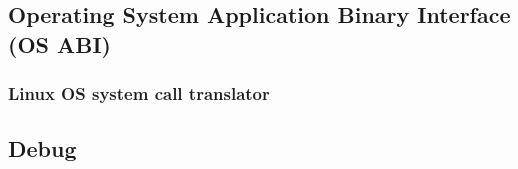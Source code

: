 % 
% 

\subsection{Operating System Application Binary Interface (OS ABI)}

\subsubsection{Linux OS system call translator}

\subsection{Debug}

